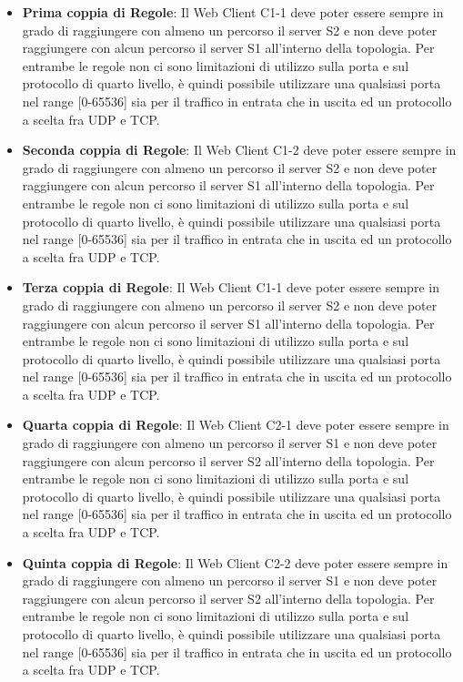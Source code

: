 \begin{itemize}
    \item \textbf{Prima coppia di Regole}: Il Web Client C1-1 deve poter essere sempre in grado di raggiungere con almeno un percorso il server S2 e non deve poter raggiungere con alcun percorso il server S1 all'interno della topologia. Per entrambe le regole non ci sono limitazioni di utilizzo sulla porta e sul protocollo di quarto livello, è quindi possibile utilizzare una qualsiasi porta nel range [0-65536] sia per il traffico in entrata che in uscita ed un protocollo a scelta fra UDP e TCP.
    \item \textbf{Seconda coppia di Regole}: Il Web Client C1-2 deve poter essere sempre in grado di raggiungere con almeno un percorso il server S2 e non deve poter raggiungere con alcun percorso il server S1 all'interno della topologia. Per entrambe le regole non ci sono limitazioni di utilizzo sulla porta e sul protocollo di quarto livello, è quindi possibile utilizzare una qualsiasi porta nel range [0-65536] sia per il traffico in entrata che in uscita ed un protocollo a scelta fra UDP e TCP. 
    \item \textbf{Terza coppia di Regole}: Il Web Client C1-1 deve poter essere sempre in grado di raggiungere con almeno un percorso il server S2 e non deve poter raggiungere con alcun percorso il server S1 all'interno della topologia. Per entrambe le regole non ci sono limitazioni di utilizzo sulla porta e sul protocollo di quarto livello, è quindi possibile utilizzare una qualsiasi porta nel range [0-65536] sia per il traffico in entrata che in uscita ed un protocollo a scelta fra UDP e TCP.
    \item \textbf{Quarta coppia di Regole}: Il Web Client C2-1 deve poter essere sempre in grado di raggiungere con almeno un percorso il server S1 e non deve poter raggiungere con alcun percorso il server S2 all'interno della topologia. Per entrambe le regole non ci sono limitazioni di utilizzo sulla porta e sul protocollo di quarto livello, è quindi possibile utilizzare una qualsiasi porta nel range [0-65536] sia per il traffico in entrata che in uscita ed un protocollo a scelta fra UDP e TCP.
    \item \textbf{Quinta coppia di Regole}: Il Web Client C2-2 deve poter essere sempre in grado di raggiungere con almeno un percorso il server S1 e non deve poter raggiungere con alcun percorso il server S2 all'interno della topologia. Per entrambe le regole non ci sono limitazioni di utilizzo sulla porta e sul protocollo di quarto livello, è quindi possibile utilizzare una qualsiasi porta nel range [0-65536] sia per il traffico in entrata che in uscita ed un protocollo a scelta fra UDP e TCP.

\end{itemize}

